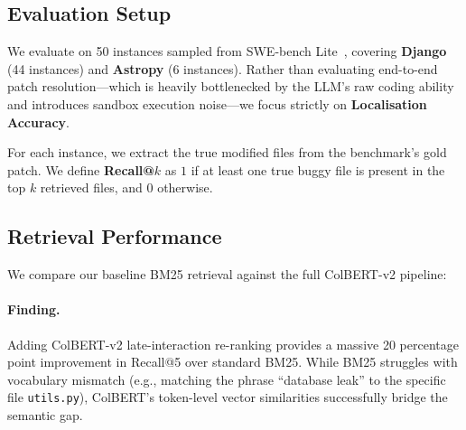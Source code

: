 \documentclass[11pt]{article}
\begin{document}
\subsection{Evaluation Setup}

We evaluate on 50 instances sampled from SWE-bench
Lite~\cite{jimenez2024swebench}, covering \textbf{Django} (44 instances) and
\textbf{Astropy} (6 instances). Rather than evaluating end-to-end patch
resolution---which is heavily bottlenecked by the LLM's raw coding ability and 
introduces sandbox execution noise---we focus strictly on \textbf{Localisation Accuracy}.

For each instance, we extract the true modified files from the benchmark's gold patch.
We define \textbf{Recall@$k$} as $1$ if at least one true buggy file is
present in the top $k$ retrieved files, and $0$ otherwise.

\subsection{Retrieval Performance}
\label{sec:ablation}

We compare our baseline BM25 retrieval against the full ColBERT-v2 pipeline:

\begin{table}[H]
\centering
\small
{}
\caption{Retrieval performance on 50 SWE-bench Lite instances. ColBERT-v2
         provides massive semantic lift, finding the correct file in the top 5
         guesses 78\% of the time.}
\label{tab:ablation}
\end{table}

\paragraph{Finding.}
Adding ColBERT-v2 late-interaction re-ranking provides a massive 20 percentage
point improvement in Recall@5 over standard BM25. While BM25 struggles with
vocabulary mismatch (e.g., matching the phrase ``database leak'' to the specific
file \texttt{utils.py}), ColBERT's token-level vector similarities successfully
bridge the semantic gap.
\end{document}

